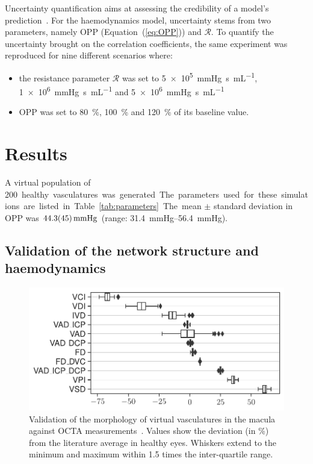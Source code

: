 \documentclass[11pt,]{article}
\begin{document}
Uncertainty quantification aims at assessing the credibility of a model's prediction~\cite{ASME2018,Viceconti2021}.
For the haemodynamics model, uncertainty stems from two parameters, namely OPP (Equation~(\ref{eq:OPP})) and $\mathcal R$.
To quantify the uncertainty brought on the correlation coefficients, the same experiment was reproduced for nine different scenarios where:
\begin{itemize}
\item the resistance parameter $\mathcal R$ was set to \SI[per-mode=symbol]{5e5}{\mmHg\second\per\mL}, \SI[per-mode=symbol]{1e6}{\mmHg\second\per\mL} and \SI[per-mode=symbol]{5e6}{\mmHg\second\per\mL}
\item OPP was set to \SI{80}{\percent}, \SI{100}{\percent} and \SI{120}{\percent} of its baseline value.
\end{itemize}


\section{Results}\label{sec:results}

A virtual population of \SI{200} healthy vasculatures was generated.
The parameters used for these simulations are listed in Table~\ref{tab:parameters}. %
The mean $\pm$ standard deviation in OPP was $\SI{44.3 \pm 4.5}{\mmHg}$ (range: \SIrange{31.4}{56.4}{\mmHg}).

\subsection{Validation of the network structure and haemodynamics}\label{sec:validation}

\begin{figure}[ht!]
  \centering
  \includegraphics[width=.95\textwidth]{Baseline_metrics}
  \caption{\label{fig:OCTAValidation}Validation of the morphology of virtual vasculatures in the macula against OCTA measurements~\cite{Chu2016,Liu_2021,Ma2021}. Values show the deviation (in \%) from the literature average in healthy eyes. Whiskers extend to the minimum and maximum within \SI{1.5}{} times the inter-quartile range.}  
\end{figure}
\end{document}
